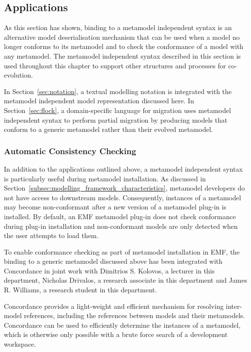 \subsection{Applications}
As this section has shown, binding to a metamodel independent syntax is an alternative model deserialisation mechanism that can be used when a model no longer conforms to its metamodel and to check the conformance of a model with any metamodel. The metamodel independent syntax described in this section is used throughout this chapter to support other structures and processes for co-evolution.

In Section~\ref{sec:notation}, a textual modelling notation is integrated with the metamodel independent model representation discussed here. In Section~\ref{sec:flock}, a domain-specific language for migration uses metamodel independent syntax to perform partial migration by producing models that conform to a generic metamodel rather than their evolved metamodel.

\subsubsection{Automatic Consistency Checking}
\label{subsec:automatic_checking}
In addition to the applications outlined above, a metamodel independent syntax is particularly useful during metamodel installation. As discussed in Section~\ref{subsec:modelling_framework_characteristics}, metamodel developers do not have access to downstream models. Consequently, instances of a metamodel may become non-conformant after a new version of a metamodel plug-in is installed. By default, an EMF metamodel plug-in does not check conformance during plug-in installation and non-conformant models are only detected when the user attempts to load them.

To enable conformance checking as part of metamodel installation in EMF, the binding to a generic metamodel discussed above has been integrated with Concordance \cite{rose10concordance} in joint work with Dimitrios S. Kolovos, a lecturer in this department, Nicholas Drivalos, a research associate in this department and James R. Williams, a research student in this department.

Concordance provides a light-weight and efficient mechanism for resolving inter-model references, including the references between models and their metamodels. Concordance can be used to efficiently determine the instances of a metamodel, which is otherwise only possible with a brute force search of a development workspace.

